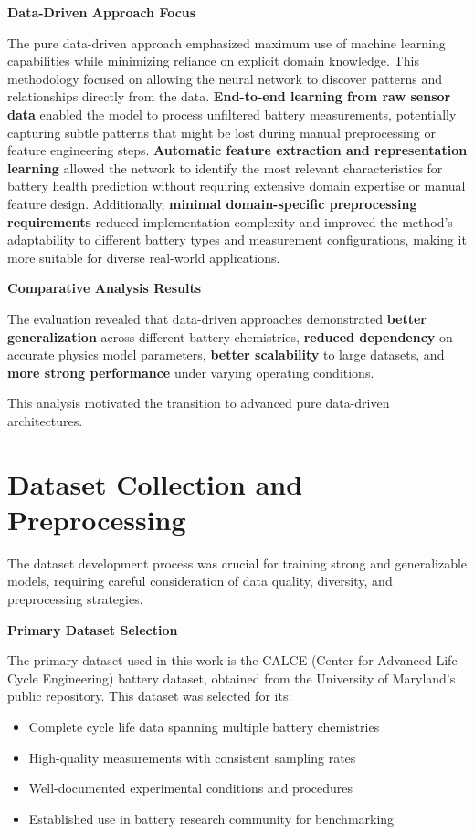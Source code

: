 \textbf{Data-Driven Approach Focus}

The pure data-driven approach emphasized maximum use of machine learning capabilities while minimizing reliance on explicit domain knowledge. This methodology focused on allowing the neural network to discover patterns and relationships directly from the data. \textbf{End-to-end learning from raw sensor data} enabled the model to process unfiltered battery measurements, potentially capturing subtle patterns that might be lost during manual preprocessing or feature engineering steps. \textbf{Automatic feature extraction and representation learning} allowed the network to identify the most relevant characteristics for battery health prediction without requiring extensive domain expertise or manual feature design. Additionally, \textbf{minimal domain-specific preprocessing requirements} reduced implementation complexity and improved the method's adaptability to different battery types and measurement configurations, making it more suitable for diverse real-world applications.

\textbf{Comparative Analysis Results}

The evaluation revealed that data-driven approaches demonstrated \textbf{better generalization} across different battery chemistries, \textbf{reduced dependency} on accurate physics model parameters, \textbf{better scalability} to large datasets, and \textbf{more strong performance} under varying operating conditions.

This analysis motivated the transition to advanced pure data-driven architectures.

\section{Dataset Collection and Preprocessing}
\label{sec:dataset_preprocessing}

The dataset development process was crucial for training strong and generalizable models, requiring careful consideration of data quality, diversity, and preprocessing strategies.

\textbf{Primary Dataset Selection}
\label{subsec:primary_dataset}

The primary dataset used in this work is the CALCE (Center for Advanced Life Cycle Engineering) battery dataset, obtained from the University of Maryland's public repository. This dataset was selected for its:

\begin{itemize}
    \item Complete cycle life data spanning multiple battery chemistries
    \item High-quality measurements with consistent sampling rates
    \item Well-documented experimental conditions and procedures
    \item Established use in battery research community for benchmarking
\end{itemize}

